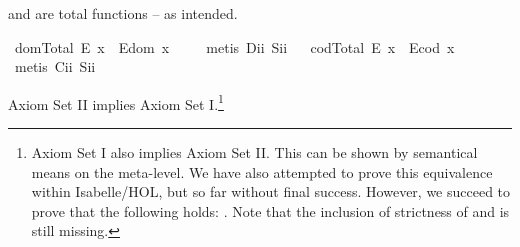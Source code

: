 \begin{isabellebody}
\begin{isamarkuptext}
 and  are total functions -- as intended.%
\end{isamarkuptext}\isamarkuptrue%
\isamarkupfalse%
\ domTotal{\isacharcolon}\ {\isachardoublequoteopen}E\ x\ \isactrlbold {\isasymrightarrow}\ E{\isacharparenleft}dom\ x{\isacharparenright}{\isachardoublequoteclose}\ \isanewline
%
\isadelimproof
\ \ %
\endisadelimproof
%
\isatagproof
{}\isamarkupfalse%
\ {\isacharparenleft}metis\ D\isactrlsub i\isactrlsub i\ S\isactrlsub i\isactrlsub i{\isacharparenright}%
\endisatagproof
{\isafoldproof}%
%
\isadelimproof
\ \isanewline
%
\endisadelimproof
{}\isamarkupfalse%
\ codTotal{\isacharcolon}\ {\isachardoublequoteopen}E\ x\ \isactrlbold {\isasymrightarrow}\ E{\isacharparenleft}cod\ x{\isacharparenright}{\isachardoublequoteclose}\ \isanewline
%
\isadelimproof
\ \ %
\endisadelimproof
%
\isatagproof
{}\isamarkupfalse%
\ {\isacharparenleft}metis\ C\isactrlsub i\isactrlsub i\ S\isactrlsub i\isactrlsub i{\isacharparenright}%
\endisatagproof
{\isafoldproof}%
%
\isadelimproof
%
\endisadelimproof
%
\begin{isamarkuptext}%
Axiom Set II implies Axiom Set I.\footnote{Axiom Set I also implies Axiom Set II. This can 
be shown by semantical means on the meta-level. We have also attempted to prove this equivalence 
within Isabelle/HOL, but so far without final success. However, we succeed to 
prove that the following holds: . Note that the inclusion of strictness of  and  is still missing.}%

\end{isamarkuptext}
\end{isabellebody}
